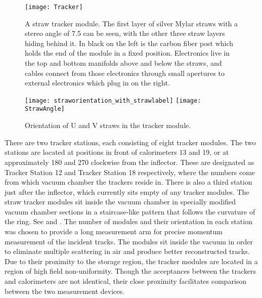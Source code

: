 \begin{figure}
    \centering
    \texttt{[image: Tracker]}
    \caption[Tracker module]{A straw tracker module. The first layer of silver Mylar straws with a stereo angle of 7.5\textdegree{} can be seen, with the other three straw layers hiding behind it. In black on the left is the carbon fiber post which holds the end of the module in a fixed position. Electronics live in the top and bottom manifolds above and below the straws, and cables connect from those electronics through small apertures to external electronics which plug in on the right.}
    \label{fig:tracker}
\end{figure}


\begin{figure}
\centering
        \texttt{[image: straworientation\_with\_strawlabel]}
    \hspace{1cm}
        \texttt{[image: StrawAngle]}
\caption[Tracker module U and V straws]{Orientation of U and V straws in the tracker module.}
\label{fig:trackermodulecoordsys}
\end{figure}



There are two tracker stations, each consisting of eight tracker modules. The two stations are located at positions in front of calorimeters 13 and 19, or at approximately 180\textdegree{} and 270\textdegree{} clockwise from the inflector. These are designated as Tracker Station 12 and Tracker Station 18 respectively, where the numbers come from which vacuum chamber the trackers reside in. There is also a third station just after the inflector, which currently sits empty of any tracker modules. The straw tracker modules sit inside the vacuum chamber in specially modified vacuum chamber sections in a staircase-like pattern that follows the curvature of the ring. See  and . The number of modules and their orientation in each station was chosen to provide a long measurement arm for precise momentum measurement of the incident tracks. The modules sit inside the vacuum in order to eliminate multiple scattering in air and produce better reconstructed tracks. Due to their proximity to the storage region, the tracker modules are located in a region of high field non-uniformity. Though the acceptances between the trackers and calorimeters are not identical, their close proximity facilitates comparison between the two measurement devices. 


